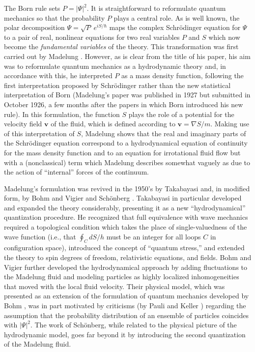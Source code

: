 \documentclass [12pt]{revtex4}
\begin{document}
The Born rule sets $P=|\Psi|^2$. It is straightforward to reformulate quantum mechanics so that the probability $P$ plays a central role. As is well known, the polar decomposition $\Psi=\sqrt{P}~e^{iS/\hbar}$ maps the complex Schr\"{o}dinger equation for $\Psi$ to a pair of real, nonlinear equations for two real variables $P$ and $S$ which now become the {\it fundamental variables} of the theory. This transformation was first carried out by Madelung \cite{M1927}. However, as is clear from the title of his paper, his aim was to reformulate quantum mechanics as a hydrodynamic theory and, in accordance with this, he interpreted $P$ as a mass density function, following the first interpretation proposed by Schr\"{o}dinger rather than the new statistical interpretation of Born (Madelung's paper was published in 1927 but submitted in October 1926, a few months after the papers in which Born introduced his new rule). In this formulation, the function $S$ plays the role of a potential for the velocity field $\textbf{v}$ of the fluid, which is defined according to $\textbf{v}=\nabla S/m$. Making use of this interpretation of $S$, Madelung shows that the real and imaginary parts of the Schr\"{o}dinger equation correspond to a hydrodynamical equation of continuity for the mass density function and to an equation for irrotational fluid flow but with a (nonclassical) term which Madelung describes somewhat vaguely as due to the action of ``internal'' forces of the continuum.

Madelung's formulation was revived in the 1950's by Takabayasi \cite{T1952, T1953} and, in modified form, by Bohm and Vigier \cite{BV1954} and Sch\"{o}nberg \cite{S1954}. Takabayasi in particular developed and expanded the theory considerably, presenting it as a new ``hydrodynamical'' quantization procedure. He recognized that full equivalence with wave mechanics required a topological condition which takes the place of single-valuedness of the wave function (i.e., that $\oint_C dS/h$ must be an integer for all loops $C$ in configuration space), introduced the concept of ``quantum stress,'' and extended the theory to spin degrees of freedom, relativistic equations, and fields. Bohm and Vigier further developed the hydrodynamical approach by adding fluctuations to the Madelung fluid and modeling particles as highly localized inhomogeneities that moved with the local fluid velocity. Their physical model, which was presented as an extension of the formulation of quantum mechanics developed by Bohm \cite{B1952}, was in part motivated by criticisms (by Pauli \cite{P1953} and Keller \cite{K1953}) regarding the assumption that the probability distribution of an ensemble of particles coincides with $|\Psi|^2$. The work of Sch\"{o}nberg, while related to the physical picture of the hydrodynamic model, goes far beyond it by introducing the second quantization of the Madelung fluid.
\end{document}

